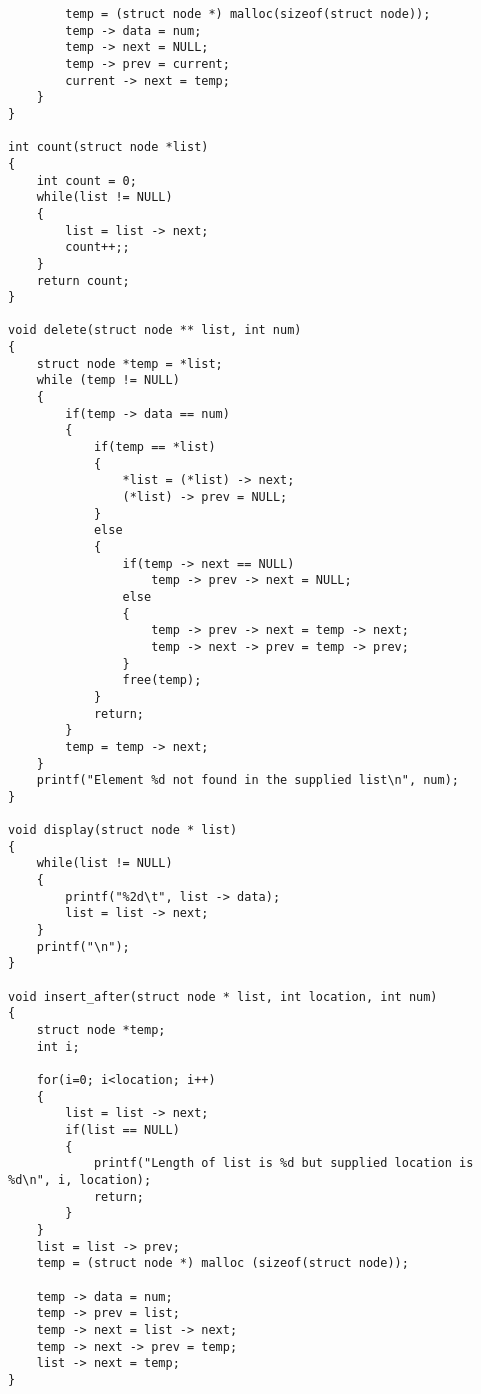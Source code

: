 \documentclass[10pt, a4paper, twosize]{article}
\begin{document}
\begin{lstlisting}
        temp = (struct node *) malloc(sizeof(struct node));
        temp -> data = num;
        temp -> next = NULL;
        temp -> prev = current;
        current -> next = temp;
    }
}

int count(struct node *list)
{
    int count = 0;
    while(list != NULL)
    {
        list = list -> next;
        count++;;
    }
    return count;
}

void delete(struct node ** list, int num)
{
    struct node *temp = *list;
    while (temp != NULL)
    {
        if(temp -> data == num)
        {
            if(temp == *list)
            {
                *list = (*list) -> next;
                (*list) -> prev = NULL;
            }
            else
            {
                if(temp -> next == NULL)
                    temp -> prev -> next = NULL;
                else
                {
                    temp -> prev -> next = temp -> next;
                    temp -> next -> prev = temp -> prev;
                }
                free(temp);
            }
            return;
        }
        temp = temp -> next;
    }
    printf("Element %d not found in the supplied list\n", num);
}

void display(struct node * list)
{
    while(list != NULL)
    {
        printf("%2d\t", list -> data);
        list = list -> next;
    }
    printf("\n");
}

void insert_after(struct node * list, int location, int num)
{
    struct node *temp;
    int i;
    
    for(i=0; i<location; i++)
    {
        list = list -> next;
        if(list == NULL)
        {
            printf("Length of list is %d but supplied location is %d\n", i, location);
            return;
        }
    }
    list = list -> prev;
    temp = (struct node *) malloc (sizeof(struct node));

    temp -> data = num;
    temp -> prev = list;
    temp -> next = list -> next;
    temp -> next -> prev = temp;
    list -> next = temp;
}
\end{lstlisting}





\end{document}
